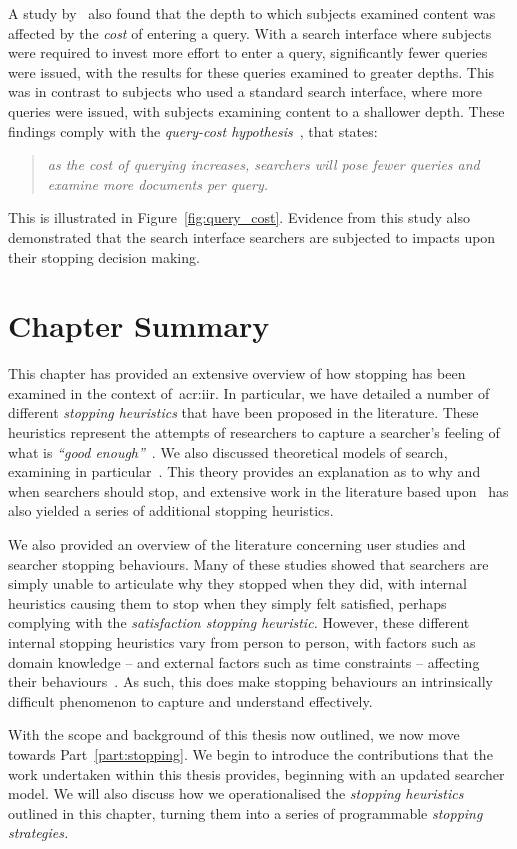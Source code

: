 A study by~\cite{azzopardi2013query_cost} also found that the depth to which subjects examined content was affected by the \emph{cost} of entering a query. With a search interface where subjects were required to invest more effort to enter a query, significantly fewer queries were issued, with the results for these queries examined to greater depths. This was in contrast to subjects who used a standard search interface, where more queries were issued, with subjects examining content to a shallower depth. These findings comply with the \emph{query-cost hypothesis}~\citep{azzopardi2011economics}, that states:

\begin{quote}
    \emph{as the cost of querying increases, searchers will pose fewer queries and examine more documents per query.}
\end{quote}

This is illustrated in Figure~\ref{fig:query_cost}. Evidence from this study also demonstrated that the search interface searchers are subjected to impacts upon their stopping decision making.

\section{Chapter Summary}
This chapter has provided an extensive overview of how stopping has been examined in the context of~\gls{acr:iir}. In particular, we have detailed a number of different \emph{stopping heuristics} that have been proposed in the literature. These heuristics represent the attempts of researchers to capture a searcher's feeling of what is \emph{``good enough''}~\citep{zach2005enough_is_enough}. We also discussed theoretical models of search, examining in particular~. This theory provides an explanation as to why and when searchers should stop, and extensive work in the literature based upon~ has also yielded a series of additional stopping heuristics.

We also provided an overview of the literature concerning user studies and searcher stopping behaviours. Many of these studies showed that searchers are simply unable to articulate why they stopped when they did, with internal heuristics causing them to stop when they simply felt satisfied, perhaps complying with the \emph{satisfaction stopping heuristic.} However, these different internal stopping heuristics vary from person to person, with factors such as domain knowledge -- and external factors such as time constraints -- affecting their behaviours~\citep{marchionini1995information_seeking}. As such, this does make stopping behaviours an intrinsically difficult phenomenon to capture and understand effectively.

With the scope and background of this thesis now outlined, we now move towards Part~\ref{part:stopping}. We begin to introduce the contributions that the work undertaken within this thesis provides, beginning with an updated searcher model. We will also discuss how we operationalised the \emph{stopping heuristics} outlined in this chapter, turning them into a series of programmable \emph{stopping strategies.}